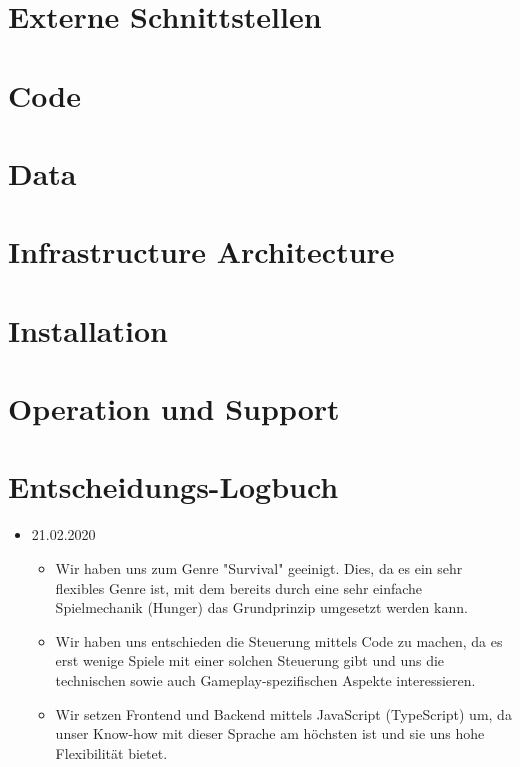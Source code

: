 \documentclass[a4paper, 11pt]{scrartcl}
\let\oldsection\section
\renewcommand\section{\clearpage\oldsection}
\begin{document}
\section{Externe Schnittstellen}

\section{Code}

\section{Data}

\section{Infrastructure Architecture}

\section{Installation}

\section{Operation und Support}

\section{Entscheidungs-Logbuch}

\begin{itemize}
\item 21.02.2020
\begin{itemize}
\item Wir haben uns zum Genre "Survival" geeinigt. Dies, da es ein sehr flexibles Genre ist, mit dem bereits durch eine sehr einfache Spielmechanik (Hunger) das Grundprinzip umgesetzt werden kann.
\item Wir haben uns entschieden die Steuerung mittels Code zu machen, da es erst wenige Spiele mit einer solchen Steuerung gibt und uns die technischen sowie auch Gameplay-spezifischen Aspekte interessieren.
\item Wir setzen Frontend und Backend mittels JavaScript (TypeScript) um, da unser Know-how mit dieser Sprache am höchsten ist und sie uns hohe Flexibilität bietet.
\end{itemize}
\end{itemize}

\clearpage

\printglossary[type=\acronymtype]

\printglossary
\end{document}
